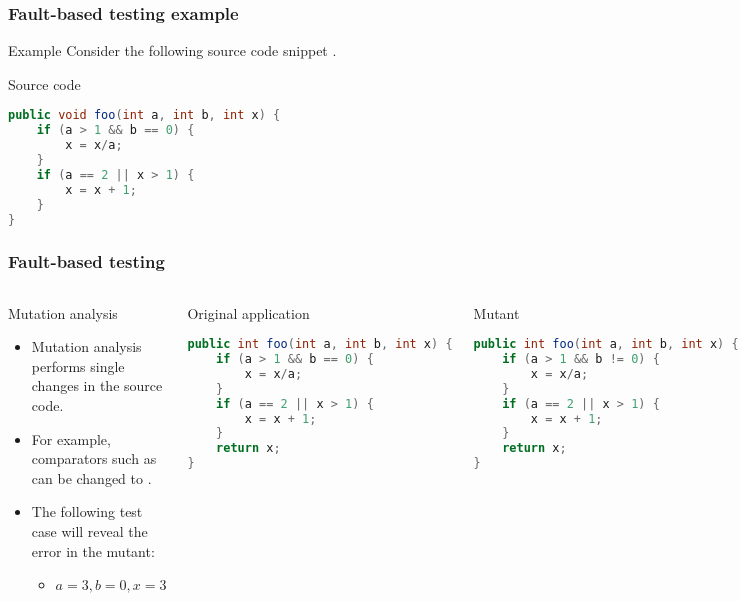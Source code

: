 \begin{frame}[hasprev=false, hasnext=true, fragile]
\frametitle{Fault-based testing example}
\label{example:fault-based-testing}

\begin{block}{Example}
Consider the following source code snippet \cite[p. 45]{myers:2004}.
\end{block}

\begin{block}{Source code}
\begin{lstlisting}[language=java]
public void foo(int a, int b, int x) {
	if (a > 1 && b == 0) {
		x = x/a;
	}
	if (a == 2 || x > 1) {
		x = x + 1;
	}
}
\end{lstlisting}
\end{block}
\end{frame}


\begin{frame}[hasprev=true, hasnext=false, fragile]
\frametitle{Fault-based testing}

\begin{columns}[t]
\begin{block}{Mutation analysis}
\begin{itemize}
	\item Mutation analysis performs single changes in the source code.

	\item For example, comparators such as \srccode{==} can be changed to
	\srccode{!=}.

	\item The following test case will reveal the error in the mutant:
	\begin{itemize}
		\item $a = 3, b = 0, x = 3$
	\end{itemize}
\end{itemize}
\end{block}
\begin{block}{Original application}
\begin{lstlisting}[language=java]
public int foo(int a, int b, int x) {
	if (a > 1 && b == 0) {
		x = x/a;
	}
	if (a == 2 || x > 1) {
		x = x + 1;
	}
	return x;
}
\end{lstlisting}
\end{block}
\begin{block}{Mutant}
\begin{lstlisting}[language=java]
public int foo(int a, int b, int x) {
	if (a > 1 && b != 0) {
		x = x/a;
	}
	if (a == 2 || x > 1) {
		x = x + 1;
	}
	return x;
}
\end{lstlisting}
\end{block}

\end{columns}
\end{frame}